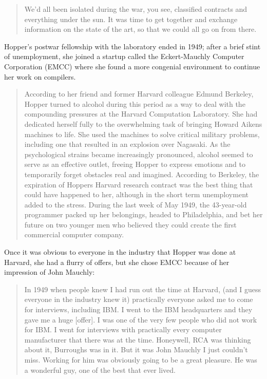 \begin{quotation}
We'd all been isolated during the war, you see, classified contracts and 
everything under the sun. It was time to get together and exchange information 
on the state of the art, so that we could all go on from there.
\end{quotation}


Hopper's postwar fellowship with the laboratory ended in 1949;
after a brief stint of unemployment, she joined a startup called the Eckert-Mauchly Computer Corporation (EMCC)
where she found a more congenial environment to continue her work on compilers.

\begin{quotation}
According to her friend and former Harvard colleague Edmund Berkeley, Hopper 
turned to alcohol during this period as a way to deal with the compounding 
pressures at the Harvard Computation Laboratory. She had dedicated herself 
fully to the overwhelming task of bringing Howard Aikens machines to life.  She 
used the machines to solve critical military problems, including one that 
resulted in an explosion over Nagasaki.  As the psychological strains became 
increasingly pronounced, alcohol seemed to serve as an effective outlet, 
freeing Hopper to express emotions and to temporarily forget obstacles real and 
imagined.  According to Berkeley, the expiration of Hoppers Harvard research 
contract was the best thing that could have happened to her, although in the 
short term unemployment added to the stress.  During the last week of May 1949, 
the 43-year-old programmer packed up her belongings, headed to Philadelphia, 
and bet her future on two younger men who believed they could create the first 
commercial computer 
company.\cite{grace_hopper_and_the_invention_of_the_information_age_2009}
\end{quotation}

Once it was obvious to everyone in the industry that Hopper was done at Harvard,
she had a flurry of offers, but she chose EMCC because of her impression of John Mauchly:

\begin{quotation}
In 1949 when people knew I had run out the time at Harvard, (and I guess 
everyone in the industry knew it) practically everyone asked me to come for 
interviews, including IBM. I went to the IBM headquarters and they gave me a 
huge [offer].  I was one of the very few people who did not work for IBM. I 
went for interviews with practically every computer manufacturer that there was 
at the time. Honeywell, RCA was thinking about it, Burroughs was in it.  But it 
was John Mauchly I just couldn't miss. Working for him was obviously going to 
be a great pleasure. He was a wonderful guy, one of the best that ever lived. 
\cite{Hopper_1980_Oral_History}
\end{quotation}

